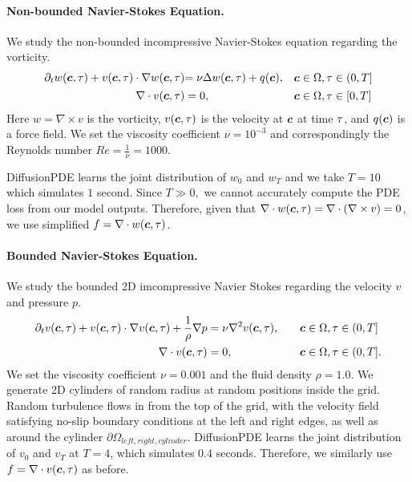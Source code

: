 \vspace{-1em}\paragraph{Non-bounded Navier-Stokes Equation.} We study the non-bounded incompressive Navier-Stokes equation regarding the vorticity. 
\begin{equation}
    \begin{aligned}
        \begin{aligned}
            \partial_tw(\boldsymbol{c}, \tau)+v(\boldsymbol{c}, \tau)\cdot\nabla w(\boldsymbol{c}, \tau)
        \end{aligned} & 
        \begin{aligned} 
            =\nu\Delta w(\boldsymbol{c}, \tau)+q(\boldsymbol{c}),
        \end{aligned} && \boldsymbol{c}\in\Omega, \tau\in(0,T] \\
        \begin{aligned}
            \nabla\cdot v(\boldsymbol{c}, \tau)
        \end{aligned}
        & =0, && \boldsymbol{c}\in\Omega, \tau\in[0,T] 
    \end{aligned}
\end{equation}
Here $w=\nabla\times v$ is the vorticity, $v(\boldsymbol{c}, \tau)$ is the velocity at $\boldsymbol{c}$ at time $\tau$, and  $q(\boldsymbol{c})$ is a force field. We set the viscosity coefficient $\nu=10^{-3}$ and correspondingly the Reynolds number $Re=\frac{1}{\nu}=1000$. 

DiffusionPDE learns the joint distribution of $w_0$ and $w_T$ and we take $T=10$ which simulates $1$ second. Since $T\gg0,$ we cannot accurately compute the PDE loss from our model outputs. Therefore, given that $\nabla\cdot w(\boldsymbol{c}, \tau)=\nabla\cdot(\nabla\times v)=0$, we use simplified $f=\nabla\cdot w(\boldsymbol{c}, \tau)$. 

\vspace{-1em}
\paragraph{Bounded Navier-Stokes Equation.} We study the bounded 2D imcompressive Navier Stokes regarding the velocity $v$ and pressure $p$. 
\begin{equation}
    \begin{aligned}
        \partial_tv(\boldsymbol{c}, \tau)+v(\boldsymbol{c}, \tau)\cdot\nabla v(\boldsymbol{c}, \tau)+\frac{1}{\rho}\nabla p&=\nu\nabla^2v(\boldsymbol{c}, \tau), \quad && \boldsymbol{c}\in\Omega, \tau\in(0,T] \\
        \nabla\cdot v(\boldsymbol{c}, \tau) &=0, && \boldsymbol{c}\in\Omega, \tau\in(0,T].
    \end{aligned}
\end{equation}
We set the viscosity coefficient $\nu=0.001$ and the fluid density $\rho=1.0$. We generate 2D cylinders of random radius at random positions inside the grid. Random turbulence flows in from the top of the grid, with the velocity field satisfying no-slip boundary conditions at the left and right edges, as well as around the cylinder $\partial \Omega_{left, right, cylinder}$. DiffusionPDE learns the joint distribution of $v_0$ and $v_T$ at $T=4$, which simulates $0.4$ seconds. Therefore, we similarly use $f=\nabla\cdot v(\boldsymbol{c}, \tau)$ as before.


